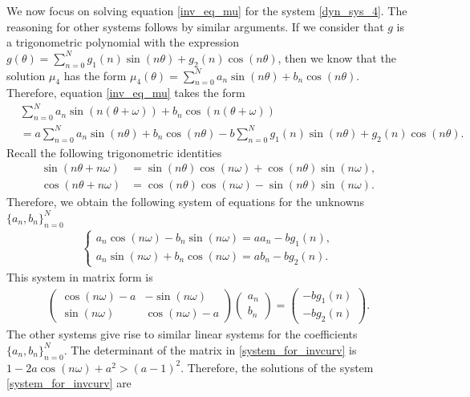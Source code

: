\documentclass[12pt]{article}
\theoremstyle{plain}
\theoremstyle{remark}
\theoremstyle{definition}
\begin{document}
We now focus on solving equation \eqref{inv_eq_mu} for the system \eqref{dyn_sys_4}. The reasoning for other systems follows by similar arguments.
If we consider that $g$ is a trigonometric polynomial with the expression $g(\theta)=\sum_{n=0}^N g_1(n)\sin(n\theta)+g_2(n)\cos(n\theta)$, then we know that the solution $\mu_4$ has the form $\mu_4(\theta)=\sum_{n=0}^N a_n\sin(n\theta)+b_n\cos(n\theta)$. Therefore, equation \eqref{inv_eq_mu} takes the form
\begin{align*}
    &\sum_{n=0}^N a_n\sin(n(\theta+\omega))+b_n\cos(n(\theta+\omega))\\
    &=a\sum_{n=0}^N a_n\sin(n\theta)+b_n\cos(n\theta) - b \sum_{n=0}^N g_1(n)\sin(n\theta)+g_2(n)\cos(n\theta).
\end{align*}
Recall the following trigonometric identities
\begin{align*}
    \sin(n\theta+n\omega)&=\sin(n\theta)\cos(n\omega)+\cos(n\theta)\sin(n\omega),\\
    \cos(n\theta+n\omega)&=\cos(n\theta)\cos(n\omega)-\sin(n\theta)\sin(n\omega).
\end{align*}
Therefore, we obtain the following system of equations for the unknowns $\{a_n,b_n\}_{n=0}^N$
\begin{align*}
    \begin{cases}
        a_n\cos(n\omega)-b_n\sin(n\omega)=a a_n-b g_1(n),\\
        a_n\sin(n\omega)+b_n\cos(n\omega)=a b_n-b g_2(n).
    \end{cases}
\end{align*}
This system in matrix form is
\begin{align}\label{system_for_invcurv}
    \begin{pmatrix}
        \cos(n\omega)-a & -\sin(n\omega)\\
        \sin(n\omega) & \cos(n\omega)-a
    \end{pmatrix}
    \begin{pmatrix}
        a_n\\
        b_n
    \end{pmatrix}
    =
    \begin{pmatrix}
        -b g_1(n)\\
        -b g_2(n)
    \end{pmatrix}.
\end{align}
The other systems give rise to similar linear systems for the coefficients $\{a_n,b_n\}_{n=0}^N$.
The determinant of the matrix in \eqref{system_for_invcurv} is $1-2a\cos(n\omega)+a^2>(a-1)^2$. Therefore, the solutions of the system \eqref{system_for_invcurv} are
\end{document}
